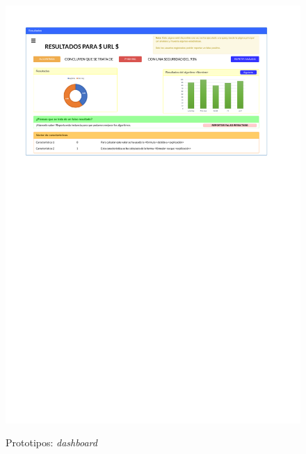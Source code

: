 \begin{figure}[h]
	\caption{Prototipos: \textit{dashboard}}
	\centering
	\includegraphics[width=\textwidth]{../img/anexos/mockups/2-mockups-dashboard}
	\label{mock:dashboard}
\end{figure}

